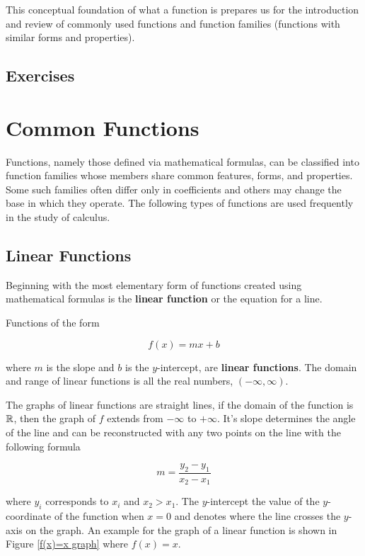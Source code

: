 This conceptual foundation of what a  function is prepares us for the introduction and review of commonly used functions and function families (functions with similar forms and properties).

\subsection{Exercises}

\section{Common Functions}
Functions, namely those defined via mathematical formulas, can be classified into function families whose members share common features, forms, and properties. Some such families often differ only in coefficients and others may change the base in which they operate. The following types of functions are used frequently in the study of calculus.

\subsection{Linear Functions}
Beginning with the most elementary form of functions created using mathematical formulas is the \textbf{linear function} or the equation for a line.

\begin{definition}
    Functions of the form

    \begin{equation}
        f(x) = mx + b
    \end{equation}

    \noindent where $m$ is the slope and $b$ is the $y$-intercept, are \textbf{linear functions}. The domain and range of linear functions is all the real numbers, $(-\infty,\infty)$.
\end{definition}

The graphs of linear functions are straight lines, if the domain of the function is $\mathbb{R}$, then the graph of $f$ extends from $-\infty$ to $+\infty$. It's slope determines the angle of the line and can be reconstructed with any two points on the line with the following formula

\begin{equation}
    m = \frac{y_2-y_1}{x_2-x_1}
    \label{slopeofaline}
\end{equation}

\noindent where $y_i$ corresponds to $x_i$ and $x_2 > x_1$. The $y$-intercept the value of the $y$-coordinate of the function when $x=0$ and denotes where the line crosses the $y$-axis on the graph. An example for the graph of a linear function is shown in Figure \ref{f(x)=x graph} where $f(x) = x$.

